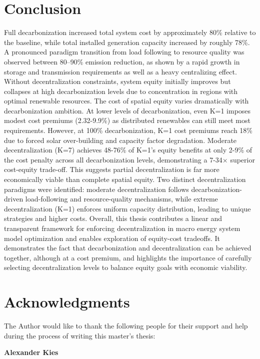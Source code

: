 \documentclass[preprint,12pt,nopreprintline]{elsarticle}
\begin{document}
\section{Conclusion}
\noindent
Full decarbonization increased total system cost by approximately 80\% relative to the baseline, while total installed generation capacity increased by roughly 78\%. A pronounced paradigm transition from load following to resource quality was observed between 80–90\% emission reduction, as shown by a rapid growth in storage and transmission requirements as well as a heavy centralizing effect. Without decentralization constraints, system equity initially improves but collapses at high decarbonization levels due to concentration in regions with optimal renewable resources.
The cost of spatial equity varies dramatically with decarbonization ambition. At lower levels of decarbonization, even K=1 imposes modest cost premiums (2.32-9.9\%) as distributed renewables can still meet most requirements. However, at 100\% decarbonization, K=1 cost premiums reach 18\% due to forced solar over-building and capacity factor degradation. Moderate decentralization (K=7) achieves 48-76\% of K=1's equity benefits at only 2-9\% of the cost penalty across all decarbonization levels, demonstrating a 7-34$\times$ superior cost-equity trade-off. This suggests partial decentralization is far more economically viable than complete spatial equity. Two distinct decentralization paradigms were identified: moderate decentralization follows decarbonization-driven load-following and resource-quality mechanisms, while extreme decentralization (K=1) enforces uniform capacity distribution, leading to unique strategies and higher costs. Overall, this thesis contributes a linear and transparent framework for enforcing decentralization in macro energy system model optimization and enables exploration of equity-cost tradeoffs. It demonstrates the fact that decarbonization and decentralization can be achieved together, although at a cost premium, and highlights the importance of carefully selecting decentralization levels to balance equity goals with economic viability.

\section{Acknowledgments}
\noindent
The Author would like to thank the following people for their support and help during the process of writing this master's thesis:

\medskip
\noindent
\textbf{Alexander Kies} 
\end{document}
